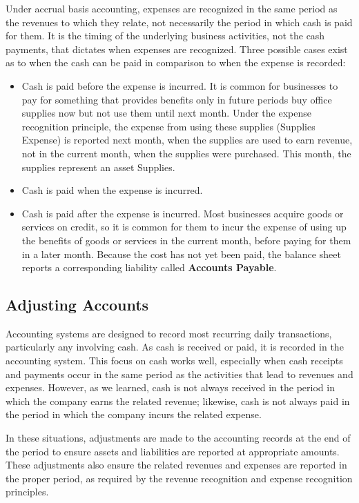 \documentclass[../main.tex]{subfiles}
\begin{document}
	Under accrual basis accounting, expenses are recognized in the same period 
	as the revenues to which they relate, not necessarily the period in which 
	cash is paid for them. It is the timing of the underlying business 
	activities, not the cash payments, that dictates when expenses are 
	recognized. Three possible cases exist as to when the cash can be paid in 
	comparison to when the expense is recorded:
	\begin{itemize}[noitemsep]
		\item Cash is paid before the expense is incurred. It is common for 
		businesses to pay for something that provides benefits only in future 
		periods \eg buy office supplies now but not use them until next month. 
		Under the expense recognition principle, the expense from using these 
		supplies (Supplies Expense) is reported next month, when the supplies 
		are used to earn revenue, not in the current month, when the supplies 
		were purchased. This month, the supplies represent an asset \ie 
		Supplies.
		\item Cash is paid when the expense is incurred.
		\item Cash is paid after the expense is incurred. Most businesses 
		acquire goods or services on credit, so it is common for them to incur 
		the expense of using up the benefits of goods or services in the 
		current month, before paying for them in a later month. Because the 
		cost has not yet been paid, the balance sheet 
		reports a corresponding liability called \textbf{Accounts Payable}.
	\end{itemize}

	\subsection{Adjusting Accounts}
	
	Accounting systems are designed to record most recurring daily 
	transactions, particularly any involving cash. As cash is received or paid, 
	it is recorded in the accounting system. This focus on cash works well, 
	especially when cash receipts and payments occur in the same period as the 
	activities that lead to revenues and expenses. However, as we learned, cash 
	is not always received in the period in which the company earns the related 
	revenue; likewise, cash is not always paid in the period in which the 
	company incurs the related expense.
	
	In these situations, adjustments are made to the accounting records at the 
	end of the period to ensure assets and liabilities are reported at 
	appropriate amounts. These adjustments also ensure the related revenues and 
	expenses are reported in the proper period, as required by the revenue 
	recognition and expense recognition principles.
	
\end{document}
